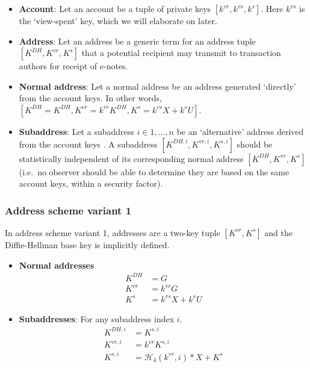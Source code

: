 \begin{itemize}
    \item \textbf{Account}: Let an account be a tuple of private keys $[k^{vr}, k^{vs}, k^s]$. Here $k^{vs}$ is the `view-spent' key, which we will elaborate on later.

    \item \textbf{Address}: Let an address be a generic term for an address tuple $[K^{DH}, K^{vr}, K^s]$ that a potential recipient may transmit to transaction authors for receipt of e-notes.

    \item \textbf{Normal address}: Let a normal address be an address generated `directly' from the account keys. In other words, $[K^{DH} = K^{DH}, K^{vr} = k^{vr} K^{DH}, K^s = k^{vs} X + k^s U]$.

    \item \textbf{Subaddress}: Let a subaddress $i \in 1,...,n$ be an `alternative' address derived from the account keys \cite{MRL-0006-subaddresses, subaddress-pull-request}. A subaddress $[K^{DH,i}, K^{vr,i}, K^{s,i}]$ should be statistically independent of its corresponding normal address $[K^{DH}, K^{vr}, K^s]$ (i.e.\ no observer should be able to determine they are based on the same account keys, within a security factor).
\end{itemize}

\subsubsection{Address scheme variant 1}

In address scheme variant 1, addresses are a two-key tuple $[K^{vr}, K^s]$ and the Diffie-Hellman base key is implicitly defined.

\begin{itemize}
    \item \textbf{Normal addresses}
    \begin{align*}
        K^{DH} &= G  \\
        K^{vr} &= k^{vr} G  \\
        K^{s} &= k^{vs} X + k^s U
    \end{align*}

    \item \textbf{Subaddresses}: For any subaddress index $i$.\vspace{.115cm}
    \begin{align*}
        K^{DH,i} &= K^{s,i}  \\
        K^{vr,i} &= k^{vr} K^{s,i}  \\
        K^{s,i} &= \mathcal{H}_4(k^{vr},i)*X + K^s
    \end{align*}
\end{itemize}

